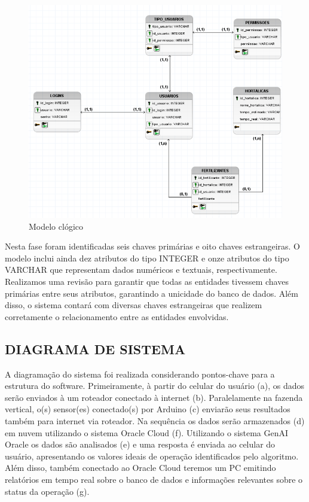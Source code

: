 \begin{figure}[!h]
\centering
\caption{Modelo clógico}
\label{fig:picture15}
\includegraphics[scale=0.8]{Illustrations/modelo logico.png}
\end{figure}

Nesta fase foram identificadas seis chaves primárias e oito chaves estrangeiras. O modelo inclui ainda dez atributos do tipo INTEGER e onze atributos do tipo VARCHAR que representam dados numéricos e textuais, respectivamente. Realizamos uma revisão para garantir que todas as entidades tivessem chaves primárias entre seus atributos, garantindo a unicidade do banco de dados. Além disso, o sistema contará com diversas chaves estrangeiras que realizem corretamente o relacionamento entre as entidades envolvidas.

\subsection*{DIAGRAMA DE SISTEMA}

A diagramação do sistema foi realizada considerando pontos-chave para a estrutura do software. Primeiramente, à partir do celular do usuário (a), os dados serão enviados à um roteador conectado à internet (b). Paralelamente na fazenda vertical, o(s) sensor(es) conectado(s) por Arduino (c) enviarão seus resultados também para internet via roteador. Na sequência os dados serão armazenados (d) em nuvem utilizando o sistema Oracle Cloud (f). Utilizando o sistema GenAI Oracle os dados são analisados (e) e uma resposta é enviada ao celular do usuário, apresentando os valores ideais de operação identificados pelo algoritmo. Além disso, também conectado ao Oracle Cloud teremos um PC emitindo relatórios em tempo real sobre o banco de dados e informações relevantes sobre o status da operação (g).

